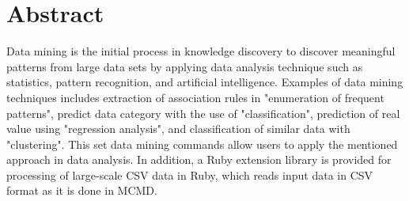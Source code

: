 

\section{Abstract\label{sect:abstract}}
Data mining is the initial process in knowledge discovery to discover meaningful patterns from large data sets by applying data analysis technique such as statistics, pattern recognition, and artificial intelligence. 
Examples of data mining techniques includes extraction of association rules in "enumeration of frequent patterns", predict data category with the use of "classification", prediction of real value using "regression analysis", and classification of similar data with "clustering".
This set data mining commands allow users to apply the mentioned approach in data analysis. In addition, a Ruby extension library is provided for processing of large-scale CSV data in Ruby, which reads input data in CSV format as it is done in MCMD. 

